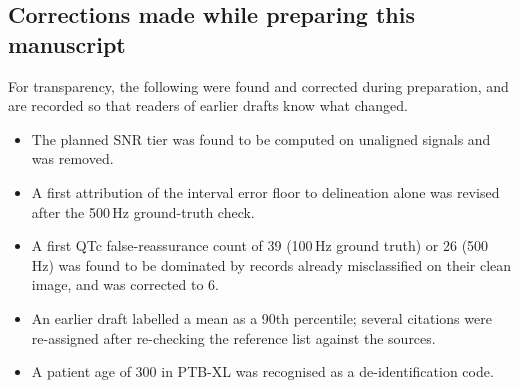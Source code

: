 \subsection{Corrections made while preparing this manuscript}
For transparency, the following were found and corrected during preparation, and are recorded so that readers of earlier drafts know what changed.
\begin{itemize}
\item The planned SNR tier was found to be computed on unaligned signals and was removed.
\item A first attribution of the interval error floor to delineation alone was revised after the 500\,Hz ground-truth check.
\item A first QTc false-reassurance count of 39 (100\,Hz ground truth) or 26 (500\,Hz) was found to be dominated by records already misclassified on their clean image, and was corrected to 6.
\item An earlier draft labelled a mean as a 90th percentile; several citations were re-assigned after re-checking the reference list against the sources.
\item A patient age of 300 in PTB-XL was recognised as a de-identification code.
\end{itemize}

